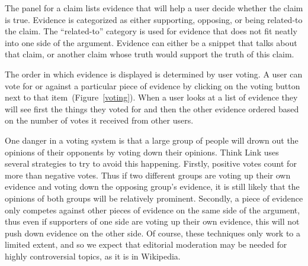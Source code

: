 \documentclass{chi2009}
\newcommand{\todo}[1]{}
\begin{document}
The panel for a claim lists evidence that will help a user decide whether the claim is true. Evidence is categorized as either supporting, opposing, or being related-to the claim. The ``related-to'' category is used for evidence that does not fit neatly into one side of the argument. Evidence can either be a snippet that talks about that claim, or another claim whose truth would support the truth of this claim. 

The order in which evidence is displayed is determined by user voting. A user can vote for or against a particular piece of evidence by clicking on the voting button next to that item~(Figure~\ref{voting}). When a user looks at a list of evidence they will see first the things they voted for and then the other evidence ordered based on the number of votes it received from other users.

One danger in a voting system is that a large group of people will drown out the opinions of their opponents by voting down their opinions. Think Link uses several strategies to try to avoid this happening. Firstly, positive votes count for more than negative votes. Thus if two different groups are voting up their own evidence and voting down the opposing group's evidence, it is still likely that the opinions of both groups will be relatively prominent. Secondly, a piece of evidence only competes against other pieces of evidence on the same side of the argument, thus even if supporters of one side are voting up their own evidence, this will not push down evidence on the other side. Of course, these techniques only work to a limited extent, and so we expect that editorial moderation may be needed for highly controversial topics, as it is in Wikipedia.

\todo{Talk about searches}
\todo{Cite work on collaborative filtering}
\todo{Mention the sidebar?}

\end{document}
